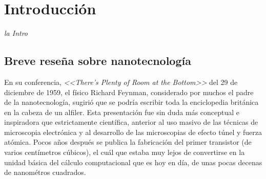 \newcommand{\NoBiblioIntro}[1]{
 \ifthenelse{\equal{#1}{verdadero}}{}{}
 \NoBiblioIntro{verdadero}}


 \FormatoCapituloUnaLinea

 \chapter{Introducción}\label{chap:Introduccion}

 \thispagestyle{empty}
	
 \noindent\textit{la Intro}

 
 \vfill
 \minitoc
 \newpage

\section{Breve reseña sobre nanotecnología}

	En su conferencia, \textit{<<There's Plenty of Room at the Bottom>>} del 29 de diciembre de 1959, el físico Richard Feynman, considerado por muchos el padre de la nanotecnología, sugirió que se podría escribir toda la enciclopedia británica en la cabeza de un alfiler.\cite{Feynman1959} Esta presentación fue sin duda más conceptual e inspiradora que estrictamente científica, anterior al uso masivo de las técnicas de microscopia electrónica y al desarrollo de las microscopias de efecto túnel y fuerza atómica. Pocos años después se publica la fabricación del primer transistor (de varios centímetros cúbicos), el cuál que estaba muy lejos de convertirse en la unidad básica del cálculo computacional que es hoy en día, de unas pocas decenas de nanométros cuadrados. 

